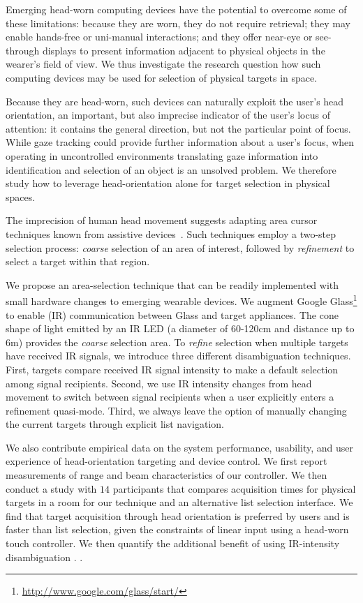 Emerging head-worn computing devices have the potential to overcome some of these limitations: because they are worn, they do not require retrieval; they may enable hands-free or uni-manual interactions; and they offer near-eye or see-through displays to present information adjacent to physical objects in the wearer's field of view. We thus investigate the research question how such computing devices may be used for selection of physical targets in space.

Because they are head-worn, such devices can naturally exploit the user's head orientation, an important, but also imprecise indicator of the user's locus of attention: it contains the general direction, but not the particular point of focus. While gaze tracking could provide further information about a user's focus, when operating in uncontrolled environments translating gaze information into identification and selection of an object is an unsolved problem.
We therefore study how to leverage head-orientation alone for target selection in physical spaces. 

The imprecision of human head movement suggests adapting area cursor techniques known from assistive devices~\cite{kabbash1995prince,worden1997making,Findlater-uist2010}. Such techniques employ a two-step selection process: {\em coarse} selection of an area of interest, followed by {\em refinement} to select a target within that region.

We propose an area-selection technique that can be readily implemented with small hardware changes to emerging wearable devices. We augment Google Glass\footnote{\url{http://www.google.com/glass/start/}} to enable (IR) communication between Glass and target appliances. The cone shape of light emitted by an IR LED (a diameter of 60-120cm and distance up to 6m) provides the {\em coarse} selection area. To {\em refine} selection when multiple targets have received IR signals, we introduce three different disambiguation techniques. First, targets compare received IR signal intensity to make a default selection among signal recipients. Second, we use IR intensity changes from head movement to switch between signal recipients when a user explicitly enters a refinement quasi-mode. Third, we always leave the option of manually changing the current targets through explicit list navigation.

We also contribute empirical data on the system performance, usability, and user experience of head-orientation targeting and device control. We first report measurements of range and beam characteristics of our controller. We then conduct a study with $14$ participants that compares acquisition times for physical targets in a room for our technique and an alternative list selection interface. We find that target acquisition through head orientation is preferred by users and is faster than list selection, given the constraints of linear input using a head-worn touch controller. 
We then quantify the additional benefit of using IR-intensity disambiguation . .

